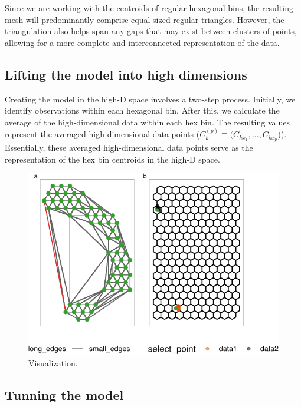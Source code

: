 \documentclass[
  12pt]{article}
\begin{document}
Since we are working with the centroids of regular hexagonal bins, the
resulting mesh will predominantly comprise equal-sized regular
triangles. However, the triangulation also helps span any gaps that may
exist between clusters of points, allowing for a more complete and
interconnected representation of the data.

\hypertarget{lifting-the-model-into-high-dimensions}{%
\subsection{Lifting the model into high
dimensions}\label{lifting-the-model-into-high-dimensions}}

Creating the model in the high-D space involves a two-step process.
Initially, we identify observations within each hexagonal bin. After
this, we calculate the average of the high-dimensional data within each
hex bin. The resulting values represent the averaged high-dimensional
data points (\(C_k^{(p)} \equiv (C_{kx_1}, ..., C_{kx_p}\))).
Essentially, these averaged high-dimensional data points serve as the
representation of the hex bin centroids in the high-D space.

\begin{figure}

{\centering \includegraphics{paper_files/figure-pdf/fig-wkhighD-1.pdf}

}

\caption{\label{fig-wkhighD}Visualization.}

\end{figure}

\hypertarget{tunning-the-model}{%
\subsection{Tunning the model}\label{tunning-the-model}}
\end{document}
